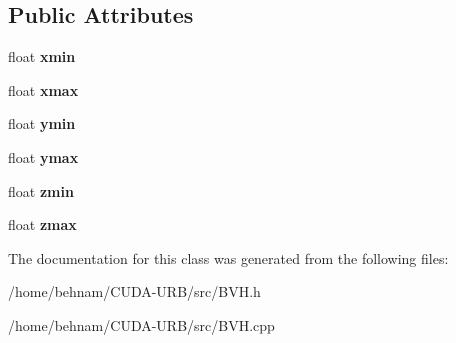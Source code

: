 \subsection*{Public Attributes}
\begin{DoxyCompactItemize}
\item 
\mbox{\label{classBVH_a30785206fdaa43dd6bb15d6bc2ebde1b}} 
float {\bfseries xmin}
\item 
\mbox{\label{classBVH_a0365945971422100f7201678a2f90704}} 
float {\bfseries xmax}
\item 
\mbox{\label{classBVH_a6806c8211fc8f5c590131e14bb45805e}} 
float {\bfseries ymin}
\item 
\mbox{\label{classBVH_a15a7b2213cc41a5f349a6a1d761303d6}} 
float {\bfseries ymax}
\item 
\mbox{\label{classBVH_a9d494f2331680f38832144546a99260c}} 
float {\bfseries zmin}
\item 
\mbox{\label{classBVH_a5c5a3f9b16fc8f9af6ed2fcc53d58f53}} 
float {\bfseries zmax}
\end{DoxyCompactItemize}


The documentation for this class was generated from the following files\+:\begin{DoxyCompactItemize}
\item 
/home/behnam/\+C\+U\+D\+A-\/\+U\+R\+B/src/B\+V\+H.\+h\item 
/home/behnam/\+C\+U\+D\+A-\/\+U\+R\+B/src/B\+V\+H.\+cpp\end{DoxyCompactItemize}
